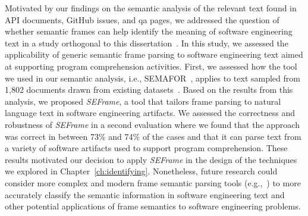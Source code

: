 Motivated by our findings on the semantic analysis of the relevant text 
found in API documents, GitHub issues, and \acs{qa} pages, 
we addressed the question of whether semantic
frames can help identify the meaning of
software engineering text
in a study 
orthogonal to this dissertation~\cite{marques2021}. 
In this study, we assessed the applicability of generic semantic frame
parsing to software engineering text
aimed at supporting program
comprehension activities.
First, we assessed how the tool we used in our semantic analysis, i.e., SEMAFOR~\cite{das2014frame},
 applies to text sampled from 1,802 documents drawn from existing datasets~\cite{Arya2019, Xu2017, Maalej2013, Chaparro2017}. 
Based on the results from this analysis, 
we proposed \textit{SEFrame}, a tool that tailors 
frame parsing to natural language text in software engineering artifacts.
We assessed the correctness and robustness of \textit{SEFrame} in a second evaluation where we found that the approach was 
 correct in between 73\% and 74\% of
the cases and that it can parse text from a variety of software artifacts used to support program
comprehension. These results motivated our decision to apply \textit{SEFrame} 
in the design of the techniques we explored in Chapter~\ref{ch:identifying}.
Nonetheless,  
future research could consider more complex and modern 
frame semantic parsing tools (e.g.,~\cite{swayamdipta17, chen2021joint}) to more
accurately classify the semantic information in software engineering
text and other potential applications 
of frame semantics to software engineering problems.
 




